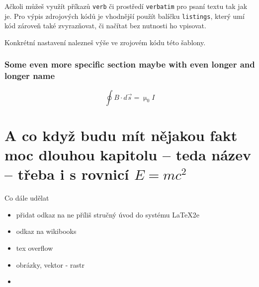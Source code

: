 \documentclass[12pt, a4paper,
 twoside,        %
 openright
]{report}
\begin{document}
Ačkoli můžeš využít příkazů \texttt{verb} či prostředí \texttt{verbatim} pro psaní textu tak jak je. Pro výpis zdrojových kódů je vhodnější použít balíčku \texttt{listings}, který umí kód zároveň také zvyrazňovat, či načítat bez nutnosti ho vpisovat.

Konkrétní nastavení nalezneš výše ve zrojovém kódu této šablony.





\subsection{Some even more specific section maybe with even longer and longer name}
\lipsum[1-2]
\begin{equation}
    \oint B \cdot d \vec{s} = \upmu_0 I
\end{equation}


\lipsum[1-3]

\chapter[Třeba to ale nějak zkrátím]{A co když budu mít nějakou fakt moc dlouhou kapitolu -- teda název -- třeba i s rovnicí $E = mc^2$}

Co dále udělat

\begin{itemize}
    \item přidat odkaz na ne příliš stručný úvod do systému \LaTeX2e
    \item odkaz na wikibooks
    \item tex overflow
    \item obrázky, vektor - rastr
    \item 
\end{itemize}
\end{document}
